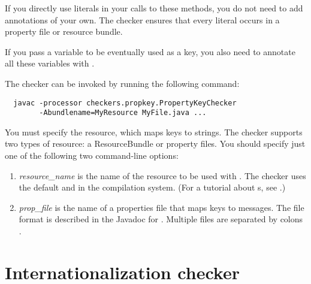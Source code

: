 If you directly use  literals in your calls to these methods,
you do not need to add annotations of your own.
The checker ensures that every  literal occurs in a
property file or resource bundle.

If you pass a  variable to be eventually used as a key, you
also need to annotate all these variables with .


The checker can be invoked by running the following
command:

\begin{Verbatim}
  javac -processor checkers.propkey.PropertyKeyChecker
        -Abundlename=MyResource MyFile.java ...
\end{Verbatim}

You must specify the resource, which maps keys to strings.
The checker supports two types of resource:
a ResourceBundle or property files.  You should specify just one of the
following two command-line options:

\begin{enumerate}

\item {}

  \emph{resource\_name} is the name of the resource to be used with
  .
  The checker uses the default  and  in the
  compilation system.
  (For a tutorial about s, see
  .)

\item {}

  \emph{prop\_file} is the name of a properties file that maps
  keys to messages.  The file format is described in
  the Javadoc for 
  .
  Multiple files are separated by colons \code{:}.

\end{enumerate}





\section{Internationalization checker\label{i18n-checker}}

